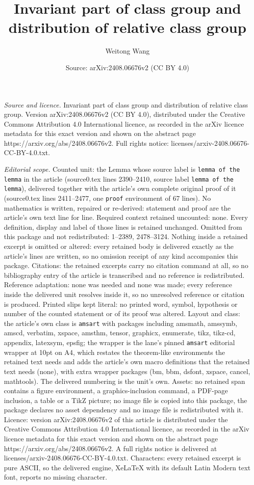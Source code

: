 \documentclass[10pt,a4paper]{amsart}
\title[Invariant part of class group and distribution of relative c]{Invariant part of class group and distribution of relative class group}
\author{Weitong Wang}
\date{Source: arXiv:2408.06676v2 (CC BY 4.0)}
\begin{document}
\maketitle

\noindent\emph{Source and licence.} Invariant part of class group and distribution of relative class group. Version arXiv:2408.06676v2 (CC BY 4.0), distributed under the Creative Commons Attribution 4.0 International licence, as recorded in the arXiv licence metadata for this exact version and shown on the abstract page https://arxiv.org/abs/2408.06676v2. Full rights notice: licenses/arxiv-2408.06676-CC-BY-4.0.txt.\par\smallskip

\noindent\textit{Editorial scope.} Counted unit: the Lemma whose source label is \texttt{lemma of the lemma} in the article (source0.tex lines 2390--2410, source label \texttt{lemma of the lemma}), delivered together with the article's own complete original proof of it (source0.tex lines 2411--2477, one \texttt{proof} environment of 67 lines). No mathematics is written, repaired or re-derived: statement and proof are the article's own text line for line. Required context retained uncounted: none. Every definition, display and label of those lines is retained unchanged. Omitted from this package and not redistributed: 1--2389, 2478--3124. Nothing inside a retained excerpt is omitted or altered: every retained body is delivered exactly as the article's lines are written, so no omission receipt of any kind accompanies this package. Citations: the retained excerpts carry no citation command at all, so no bibliography entry of the article is transcribed and no reference is redistributed. Reference adaptation: none was needed and none was made; every reference inside the delivered unit resolves inside it, so no unresolved reference or citation is produced. Printed slips kept literal: no printed word, symbol, hypothesis or number of the counted statement or of its proof was altered. Layout and class: the article's own class is \texttt{amsart} with packages including amsmath, amssymb, amscd, verbatim, xspace, amsthm, tensor, graphicx, enumerate, tikz, tikz-cd, appendix, latexsym, epsfig; the wrapper is the lane's pinned \texttt{amsart} editorial wrapper at 10pt on A4, which restates the theorem-like environments the retained text needs and adds the article's own macro definitions that the retained text needs (none), with extra wrapper packages (bm, bbm, dsfont, xspace, cancel, mathtools). The delivered numbering is the unit's own. Assets: no retained span contains a figure environment, a graphics-inclusion command, a PDF-page inclusion, a table or a TikZ picture; no image file is copied into this package, the package declares no asset dependency and no image file is redistributed with it. Licence: version arXiv:2408.06676v2 of this article is distributed under the Creative Commons Attribution 4.0 International licence, as recorded in the arXiv licence metadata for this exact version and shown on the abstract page https://arxiv.org/abs/2408.06676v2. A full rights notice is delivered at licenses/arxiv-2408.06676-CC-BY-4.0.txt. Characters: every retained excerpt is pure ASCII, so the delivered engine, XeLaTeX with its default Latin Modern text font, reports no missing character.
\end{document}
